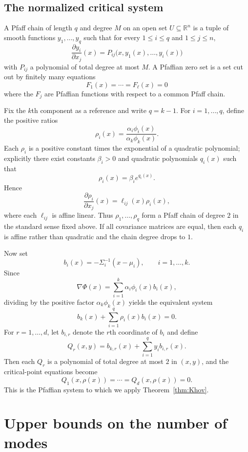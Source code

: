 \documentclass[11pt]{article}
\theoremstyle{plain}
\theoremstyle{definition}
\theoremstyle{remark}
\numberwithin{equation}{section}
\newcommand{\R}{\mathbb{R}}
\begin{document}
\subsection{The normalized critical system}\label{subsec:normalized-system}

A Pfaff chain of length $q$ and degree $M$ on an open set $U\subseteq\R^n$ is a tuple of smooth functions $y_1,\dots,y_q$ such that for every $1\le i\le q$ and $1\le j\le n$,
\[
\frac{\partial y_i}{\partial x_j}(x)=P_{ij}\bigl(x,y_1(x),\dots,y_i(x)\bigr)
\]
with $P_{ij}$ a polynomial of total degree at most $M$. A Pfaffian zero set is a set cut out by finitely many equations
\[
F_1(x)=\cdots=F_\ell(x)=0
\]
where the $F_j$ are Pfaffian functions with respect to a common Pfaff chain.

Fix the $k$th component as a reference and write $q=k-1$. For $i=1,\dots,q$, define the positive ratios
\[
\rho_i(x)=\frac{\alpha_i\phi_i(x)}{\alpha_k\phi_k(x)}.
\]
Each $\rho_i$ is a positive constant times the exponential of a quadratic polynomial; explicitly there exist constants $\beta_i>0$ and quadratic polynomials $q_i(x)$ such that
\[
\rho_i(x)=\beta_i e^{q_i(x)}.
\]
Hence
\[
\frac{\partial \rho_i}{\partial x_j}(x)=\ell_{ij}(x)\rho_i(x),
\]
where each $\ell_{ij}$ is affine linear. Thus $\rho_1,\dots,\rho_q$ form a Pfaff chain of degree $2$ in the standard sense fixed above. If all covariance matrices are equal, then each $q_i$ is affine rather than quadratic and the chain degree drops to $1$.

Now set
\[
b_i(x)=-\Sigma_i^{-1}(x-\mu_i),\qquad i=1,\dots,k.
\]
Since
\[
\nabla \Phi(x)=\sum_{i=1}^k \alpha_i\phi_i(x)b_i(x),
\]
dividing by the positive factor $\alpha_k\phi_k(x)$ yields the equivalent system
\begin{equation}\label{eq:normalized-system}
b_k(x)+\sum_{i=1}^{q}\rho_i(x)b_i(x)=0.
\end{equation}
For $r=1,\dots,d$, let $b_{i,r}$ denote the $r$th coordinate of $b_i$ and define
\[
Q_r(x,y)=b_{k,r}(x)+\sum_{i=1}^{q} y_i b_{i,r}(x).
\]
Then each $Q_r$ is a polynomial of total degree at most $2$ in $(x,y)$, and the critical-point equations become
\[
Q_1(x,\rho(x))=\cdots=Q_d(x,\rho(x))=0.
\]
This is the Pfaffian system to which we apply Theorem~\ref{thm:Khov}.


\section{Upper bounds on the number of modes}\label{sec:upper-mode-bounds}
\end{document}
